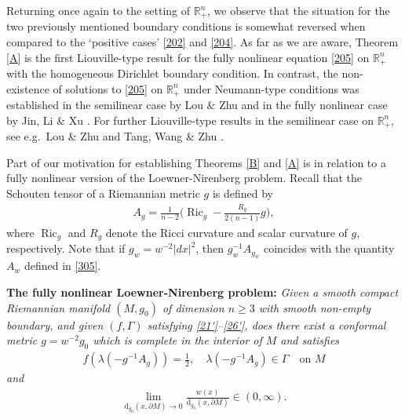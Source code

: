 \documentclass[12pt]{article}
\numberwithin{equation}{section}
\theoremstyle{plain}
\theoremstyle{definition}
\begin{document}
Returning once again to the setting of $\mathbb{R}_+^n$, we observe that the situation for the two previously mentioned boundary conditions is somewhat reversed when compared to the `positive cases' \eqref{202} and \eqref{204}. As far as we are aware, Theorem \ref{A} is the first Liouville-type result for the fully nonlinear equation \eqref{205} on $\mathbb{R}_+^n$ with the homogeneous Dirichlet boundary condition. In contrast, the non-existence of solutions to \eqref{205} on $\mathbb{R}_+^n$ under Neumann-type conditions was established in the semilinear case by Lou \& Zhu \cite{LouZhu99} and in the fully nonlinear case by Jin, Li \& Xu \cite{JLX05}. For further Liouville-type results in the semilinear case on $\mathbb{R}_+^n$, see e.g.~Lou \& Zhu \cite{LouZhu99} and Tang, Wang \& Zhu \cite{TWZ22}.\medskip 





Part of our motivation for establishing Theorems \ref{B} and \ref{A} is in relation to a fully nonlinear version of the Loewner-Nirenberg problem. Recall that the Schouten tensor of a Riemannian metric $g$ is defined by
\begin{align*}
A_g = \frac{1}{n-2}\bigg(\operatorname{Ric}_g - \frac{R_g}{2(n-1)}g\bigg),
\end{align*} 
where $\operatorname{Ric}_g$ and $R_g$ denote the Ricci curvature and scalar curvature of $g$, respectively. Note that if $g_w = w^{-2}|dx|^2$, then $g_w^{-1}A_{g_w}$ coincides with the quantity $A_w$ defined in \eqref{305}.\medskip 


\noindent\textbf{The fully nonlinear Loewner-Nirenberg problem:} \textit{Given a smooth compact Riemannian manifold $(M,g_0)$ of dimension $n\geq 3$ with smooth non-empty boundary, and given $(f,\Gamma)$ satisfying \eqref{21'}--\eqref{26'}, does there exist a conformal metric $g = w^{-2}g_0$ which is complete in the interior of $M$ and satisfies}
\begin{align}\label{105}
f(\lambda(-g^{-1}A_g)) = \frac{1}{2}, \quad \lambda(-g^{-1}A_g)\in\Gamma \quad \text{on }M 
\end{align}
\textit{and}
\begin{align}
\lim_{\mathrm{d}_{g_0}(x,\partial M)\rightarrow 0} \frac{w(x)}{\mathrm{d}_{g_0}(x,\partial M)} \in(0,\infty).
\end{align}
\end{document}
